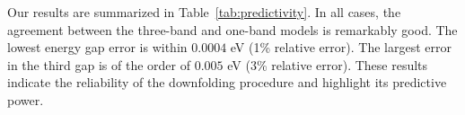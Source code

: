 Our results are summarized in Table~\ref{tab:predictivity}. In all cases, 
the agreement between the three-band and one-band models is remarkably good. The lowest energy gap error 
is within $0.0004$ eV (1\% relative error). 
The largest error in the third gap is of the order of $0.005$ eV (3\% relative error).
These results indicate the reliability of the downfolding procedure 
and highlight its predictive power. 


